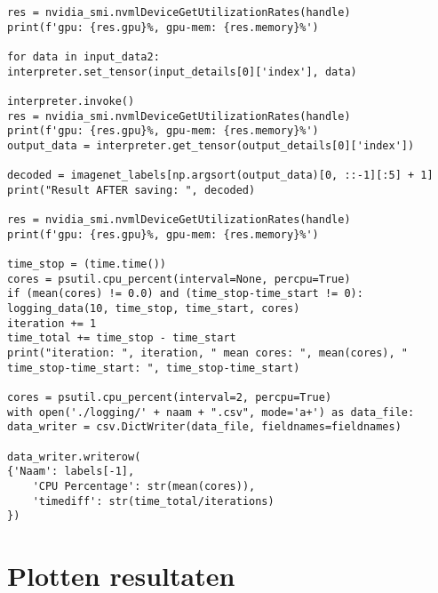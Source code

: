 \begin{lstlisting}
res = nvidia_smi.nvmlDeviceGetUtilizationRates(handle)
print(f'gpu: {res.gpu}%, gpu-mem: {res.memory}%')

for data in input_data2:
interpreter.set_tensor(input_details[0]['index'], data)

interpreter.invoke()
res = nvidia_smi.nvmlDeviceGetUtilizationRates(handle)
print(f'gpu: {res.gpu}%, gpu-mem: {res.memory}%')
output_data = interpreter.get_tensor(output_details[0]['index'])

decoded = imagenet_labels[np.argsort(output_data)[0, ::-1][:5] + 1]
print("Result AFTER saving: ", decoded)

res = nvidia_smi.nvmlDeviceGetUtilizationRates(handle)
print(f'gpu: {res.gpu}%, gpu-mem: {res.memory}%')

time_stop = (time.time())
cores = psutil.cpu_percent(interval=None, percpu=True)
if (mean(cores) != 0.0) and (time_stop-time_start != 0):
logging_data(10, time_stop, time_start, cores)
iteration += 1
time_total += time_stop - time_start
print("iteration: ", iteration, " mean cores: ", mean(cores), " time_stop-time_start: ", time_stop-time_start)

cores = psutil.cpu_percent(interval=2, percpu=True)
with open('./logging/' + naam + ".csv", mode='a+') as data_file:
data_writer = csv.DictWriter(data_file, fieldnames=fieldnames)

data_writer.writerow(
{'Naam': labels[-1],
	'CPU Percentage': str(mean(cores)),
	'timediff': str(time_total/iterations)
})
\end{lstlisting}











\newpage
\section{Plotten resultaten} \label{sec:bijlageplotresults}

